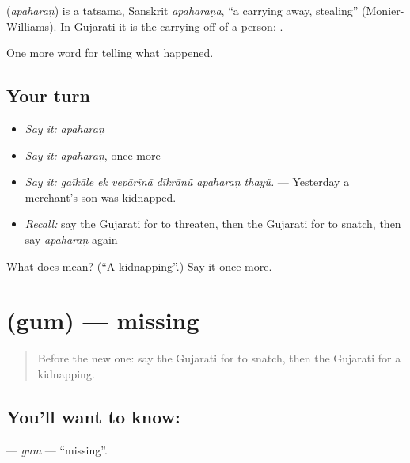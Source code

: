 \begin{cousinweb}
\textbf{} (\emph{apaharaṇ}) is a tatsama, Sanskrit \emph{apaharaṇa}, \textquotedblleft{}a carrying away, stealing\textquotedblright{} (Monier-Williams). In Gujarati it is the carrying off of a person: \textbf{  }.
\end{cousinweb}

\begin{grammarlens}[title={What you've built}]
One more word for telling what happened.
\end{grammarlens}

\subsection*{Your turn}
\begin{itemize}
\raggedright
  \item \emph{Say it:} \emph{apaharaṇ}
  \item \emph{Say it:} \emph{apaharaṇ}, once more
  \item \emph{Say it:} \emph{gaīkāle ek vepārīnā dīkrānũ apaharaṇ thayũ.} — Yesterday a merchant's son was kidnapped.
  \item \emph{Recall:} say the Gujarati for to threaten, then the Gujarati for to snatch, then say \emph{apaharaṇ} again
\end{itemize}

\begin{tcolorbox}[breakable,colback=teal!4,colframe=teal!35!black,title={Before you move on}]
What does  mean? (\textquotedblleft{}A kidnapping\textquotedblright{}.) Say it once more.
\end{tcolorbox}
\section[\texorpdfstring{\gu{ગુમ} (gum)}{ગુમ (gum)}]{ (gum) — missing}

\label{lesson:GU-C291-gum}



\begin{quote}
Before the new one: say the Gujarati for to snatch, then the Gujarati for a kidnapping.
\end{quote}

\subsection*{You'll want to know: }
\textbf{} — \emph{gum} — \textquotedblleft{}missing\textquotedblright{}.

